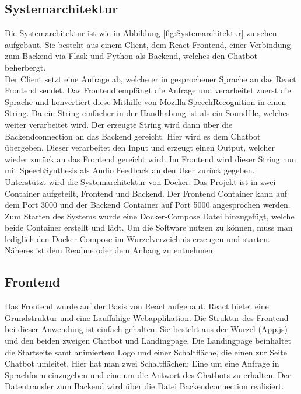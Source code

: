 \documentclass{aa}
\begin{document}
    \subsection{Systemarchitektur}
    
        Die Systemarchitektur ist wie in Abbildung   \ref{fig:Systemarchitektur} zu sehen aufgebaut. Sie besteht aus einem Client, dem React Frontend, einer Verbindung zum Backend via Flask und Python als Backend, welches den Chatbot beherbergt.\\
        Der Client setzt eine Anfrage ab, welche er in gesprochener Sprache an das React Frontend sendet. Das Frontend empfängt die Anfrage und verarbeitet zuerst die Sprache und konvertiert diese Mithilfe von Mozilla SpeechRecognition \cite[Vgl.]{mozilla20} in einen String. Da ein String einfacher in der Handhabung ist als ein Soundfile, welches weiter verarbeitet wird. Der erzeugte String wird dann über die Backendconnection an das Backend gereicht. Hier wird es dem Chatbot übergeben. Dieser verarbeitet den Input und erzeugt einen Output, welcher wieder zurück an das Frontend gereicht wird. Im Frontend wird dieser String nun mit SpeechSynthesis \cite[Vgl.]{mozilla19} als Audio Feedback an den User zurück gegeben.\\
        Unterstützt wird die Systemarchitektur von Docker. Das Projekt ist in zwei Container aufgeteilt, Frontend und Backend. Der Frontend Container kann auf dem Port 3000 und der Backend Container auf Port 5000 angesprochen werden. Zum Starten des Systems wurde eine Docker-Compose Datei hinzugefügt, welche beide Container erstellt und lädt. Um die Software nutzen zu können, muss man lediglich den Docker-Compose im Wurzelverzeichnis erzeugen und starten. Näheres ist dem Readme  \cite[Vgl.]{auntelisa} oder dem Anhang zu entnehmen.
    
    \subsection{Frontend}
        Das Frontend wurde auf der Basis von React aufgebaut. React bietet eine Grundstruktur und eine Lauffähige Webapplikation. Die Struktur des Frontend bei dieser Anwendung ist einfach gehalten. Sie besteht aus der Wurzel (App.js) und den beiden zweigen Chatbot und Landingpage. Die Landingpage beinhaltet die Startseite samt animiertem Logo und einer Schaltfläche, die einen zur Seite Chatbot umleitet. Hier hat man zwei Schaltflächen: Eine um eine Anfrage in Sprachform einzugeben und eine um die Antwort des Chatbots zu erhalten. Der Datentransfer zum Backend wird über die Datei Backendconnection realisiert.
        
\end{document}
